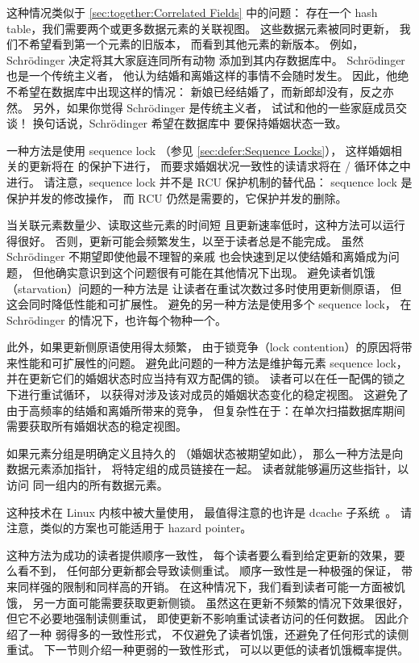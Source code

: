 这种情况类似于 \cref{sec:together:Correlated Fields} 中的问题：
存在一个 hash table，我们需要两个或更多数据元素的关联视图。
这些数据元素被同时更新，
我们不希望看到第一个元素的旧版本，
而看到其他元素的新版本。
例如，Schr\"odinger 决定将其大家庭连同所有动物
添加到其内存数据库中。
Schr\"odinger 也是一个传统主义者，
他认为结婚和离婚这样的事情不会随时发生。
因此，他绝不希望在数据库中出现这样的情况：
新娘已经结婚了，而新郎却没有，反之亦然。
另外，如果你觉得 Schr\"odinger 是传统主义者，
试试和他的一些家庭成员交谈！
换句话说，Schr\"odinger 希望在数据库中
要保持婚姻状态一致。

一种方法是使用 sequence lock
（参见 \cref{sec:defer:Sequence Locks}），
这样婚姻相关的更新将在
 的保护下进行，
而要求婚姻状况一致性的读请求将在
 /  循环体之中进行。
请注意，sequence lock 并不是 RCU 保护机制的替代品：
sequence lock 是保护并发的修改操作，
而 RCU 仍然是需要的，它保护并发的删除。

当关联元素数量少、读取这些元素的时间短
且更新速率低时，这种方法可以运行得很好。
否则，更新可能会频繁发生，以至于读者总是不能完成。
虽然 Schr\"odinger 不期望即使他最不理智的亲戚
也会快速到足以使结婚和离婚成为问题，
但他确实意识到这个问题很有可能在其他情况下出现。
避免读者饥饿（starvation）问题的一种方法是
让读者在重试次数过多时使用更新侧原语，
但这会同时降低性能和可扩展性。
避免的另一种方法是使用多个 sequence lock，
在 Schr\"odinger 的情况下，也许每个物种一个。

此外，如果更新侧原语使用得太频繁，
由于锁竞争（lock contention）的原因将带来性能和可扩展性的问题。
避免此问题的一种方法是维护每元素 sequence lock，
并在更新它们的婚姻状态时应当持有双方配偶的锁。
读者可以在任一配偶的锁之下进行重试循环，
以获得对涉及该对成员的婚姻状态变化的稳定视图。
这避免了由于高频率的结婚和离婚所带来的竞争，
但复杂性在于：在单次扫描数据库期间
需要获取所有婚姻状态的稳定视图。

如果元素分组是明确定义且持久的
（婚姻状态被期望如此），
那么一种方法是向数据元素添加指针，
将特定组的成员链接在一起。
读者就能够遍历这些指针，以访问
同一组内的所有数据元素。

这种技术在 Linux 内核中被大量使用，
最值得注意的也许是 dcache 子系统~\cite{NeilBrown2015RCUwalk}。
请注意，类似的方案也可能适用于 hazard pointer。

这种方法为成功的读者提供顺序一致性，
每个读者要么看到给定更新的效果，要么看不到，
任何部分更新都会导致读侧重试。
顺序一致性是一种极强的保证，
带来同样强的限制和同样高的开销。
在这种情况下，我们看到读者可能一方面被饥饿，
另一方面可能需要获取更新侧锁。
虽然这在更新不频繁的情况下效果很好，
但它不必要地强制读侧重试，
即使更新不影响重试读者访问的任何数据。
 因此介绍了一种
弱得多的一致性形式，
不仅避免了读者饥饿，还避免了任何形式的读侧重试。
下一节则介绍一种更弱的一致性形式，
可以以更低的读者饥饿概率提供。

